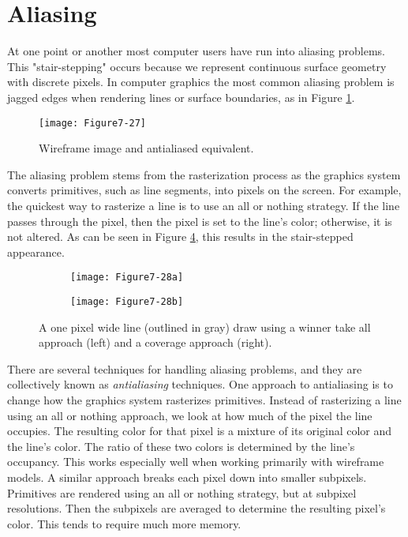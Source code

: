 \section{Aliasing}

At one point or another most computer users have run into aliasing problems. This "stair-stepping" occurs because we represent continuous surface geometry with discrete pixels. In computer graphics the most common aliasing problem is jagged edges when rendering lines or surface boundaries, as in Figure \ref{fig:Figure7-27}.

\begin{figure}[!htb]
	\centering
	\texttt{[image: Figure7-27]}\\
	\caption{Wireframe image and antialiased equivalent.}\label{fig:Figure7-27}
\end{figure}

The aliasing problem stems from the rasterization process as the graphics system converts primitives, such as line segments, into pixels on the screen. For example, the quickest way to rasterize a line is to use an all or nothing strategy. If the line passes through the pixel, then the pixel is set to the line's color; otherwise, it is not altered. As can be seen in Figure \ref{fig:Figure7-28}, this results in the stair-stepped appearance.

\begin{figure}[!htb]
	\centering
	\begin{subfigure}{0.48\linewidth}
		\centering
		\texttt{[image: Figure7-28a]}
		\caption*{}\label{fig:Figure7-28a}
	\end{subfigure}
	\hfill
	\begin{subfigure}{0.48\linewidth}
		\centering
		\texttt{[image: Figure7-28b]}
		\caption*{}\label{fig:Figure7-28b}
	\end{subfigure}%
	\caption{A one pixel wide line (outlined in gray) draw using a winner take all approach (left) and a coverage approach (right).}
	\label{fig:Figure7-28}
\end{figure}

There are several techniques for handling aliasing problems, and they are collectively known as \emph{antialiasing} techniques. One approach to antialiasing is to change how the graphics system rasterizes primitives. Instead of rasterizing a line using an all or nothing approach, we look at how much of the pixel the line occupies. The resulting color for that pixel is a mixture of its original color and the line's color. The ratio of these two colors is determined by the line's occupancy. This works especially well when working primarily with wireframe models. A similar approach breaks each pixel down into smaller subpixels. Primitives are rendered using an all or nothing strategy, but at subpixel resolutions. Then the subpixels are averaged to determine the resulting pixel's color. This tends to require much more memory.

